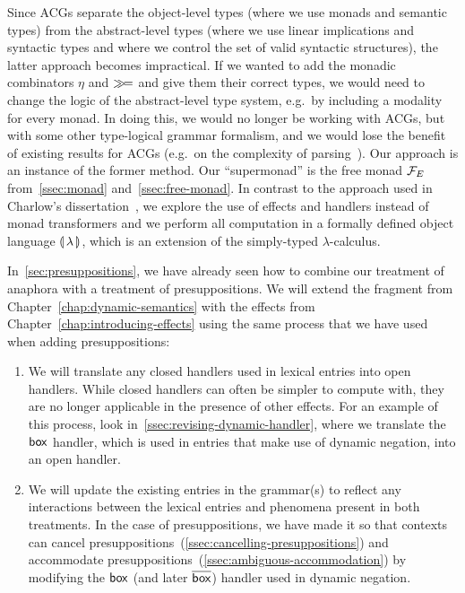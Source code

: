 Since ACGs separate the object-level types (where we use monads and
semantic types) from the abstract-level types (where we use linear
implications and syntactic types and where we control the set of valid
syntactic structures), the latter approach becomes impractical. If we
wanted to add the monadic combinators $\eta$ and $\mathbin{\gg\!=}$ and give them
their correct types, we would need to change the logic of the
abstract-level type system, e.g.\ by including a modality for every
monad. In doing this, we would no longer be working with ACGs, but with
some other type-logical grammar formalism, and we would lose the benefit of
existing results for ACGs (e.g.\ on the complexity of
parsing~\cite{kanazawa2007parsing}). Our approach is an instance of the
former method. Our ``supermonad'' is the free monad $\mathcal{F}_E$
from~\ref{ssec:monad} and~\ref{ssec:free-monad}. In contrast to the
approach used in Charlow's dissertation~\cite{charlow2014semantics}, we
explore the use of effects and handlers instead of monad transformers and
we perform all computation in a formally defined object language ${\llparenthesis \, \lambda \, \rrparenthesis}$,
which is an extension of the simply-typed $\lambda$-calculus.

In~\ref{sec:presuppositions}, we have already seen how to combine our
treatment of anaphora with a treatment of presuppositions. We will extend
the fragment from Chapter~\ref{chap:dynamic-semantics} with the effects
from Chapter~\ref{chap:introducing-effects} using the same process that we
have used when adding presuppositions:

\begin{enumerate}
\item We will translate any closed handlers used in lexical entries into
  open handlers. While closed handlers can often be simpler to compute
  with, they are no longer applicable in the presence of other effects. For
  an example of this process, look in~\ref{ssec:revising-dynamic-handler},
  where we translate the $\mathsf{box}$ handler, which is used in entries that make
  use of dynamic negation, into an open handler.
\item We will update the existing entries in the grammar(s) to reflect any
  interactions between the lexical entries and phenomena present in both
  treatments. In the case of presuppositions, we have made it so that
  contexts can cancel
  presuppositions~(\ref{ssec:cancelling-presuppositions}) and accommodate
  presuppositions~(\ref{ssec:ambiguous-accommodation}) by modifying the
  $\mathsf{box}$ (and later $\overline{\mathsf{box}}$) handler used in dynamic negation.
\end{enumerate}


